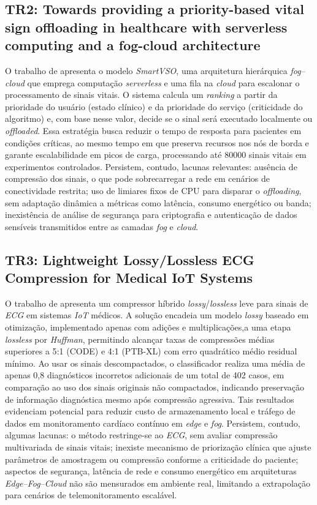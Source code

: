 \documentclass[twoside,english,brazilian]{UNISINOSmonografia}
\begin{document}
\subsection{TR2: Towards providing a priority-based vital sign offloading in healthcare with serverless computing and a fog-cloud architecture \cite{CASSEL2024}}
O trabalho de \cite{CASSEL2024} apresenta o modelo \textit{SmartVSO}, uma arquitetura hierárquica \textit{fog–cloud} que emprega computação \textit{serverless} e uma fila na \textit{cloud} para escalonar o processamento de sinais vitais. O sistema calcula um \textit{ranking} a partir da prioridade do usuário (estado clínico) e da prioridade do serviço (criticidade do algoritmo) e, com base nesse valor, decide se o sinal será executado localmente ou \textit{offloaded}. Essa estratégia busca reduzir o tempo de resposta para pacientes em condições críticas, ao mesmo tempo em que preserva recursos nos nós de borda e garante escalabilidade em picos de carga, processando até 80000 sinais vitais em experimentos controlados. Persistem, contudo, lacunas relevantes: ausência de compressão dos sinais, o que pode sobrecarregar a rede em cenários de conectividade restrita; uso de limiares fixos de CPU para disparar o \textit{offloading}, sem adaptação dinâmica a métricas como latência, consumo energético ou banda; inexistência de análise de segurança para criptografia e autenticação de dados sensíveis transmitidos entre as camadas \textit{fog} e \textit{cloud}.

\subsection{TR3: Lightweight Lossy/Lossless ECG Compression for Medical IoT Systems \cite{Chang2024}}
O trabalho de \cite{Chang2024} apresenta um compressor híbrido \textit{lossy}/\textit{lossless} leve para sinais de \textit{ECG} em sistemas \textit{IoT} médicos. A solução encadeia um modelo \textit{lossy} baseado em otimização, implementado apenas com adições e multiplicações,a uma etapa \textit{lossless} por \textit{Huffman}, permitindo alcançar taxas de compressões médias superiores a 5{:}1 (CODE) e 4{:}1 (PTB-XL) com erro quadrático médio residual mínimo. Ao usar os sinais descompactados, o classificador realiza uma média de apenas 0,8 diagnósticos incorretos adicionais de um total de 402 casos, em comparação ao uso dos sinais originais não compactados, indicando preservação de informação diagnóstica mesmo após compressão agressiva. Tais resultados evidenciam potencial para reduzir custo de armazenamento local e tráfego de dados em monitoramento cardíaco contínuo em \textit{edge} e \textit{fog}. Persistem, contudo, algumas lacunas: o método restringe-se ao \textit{ECG}, sem avaliar compressão multivariada de sinais vitais; inexiste mecanismo de priorização clínica que ajuste parâmetros de amostragem ou compressão conforme a criticidade do paciente; aspectos de segurança, latência de rede e consumo energético em arquiteturas \textit{Edge–Fog–Cloud} não são mensurados em ambiente real, limitando a extrapolação para cenários de telemonitoramento escalável.
\end{document}
